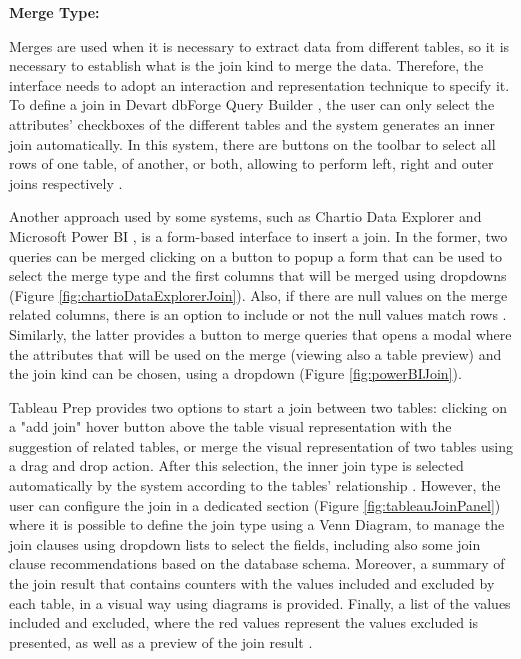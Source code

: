 \textbf{Merge Type:}



Merges are used when it is necessary to extract data from different tables, so it is necessary to establish what is the join kind to merge the data. Therefore, the interface needs to adopt an interaction and representation technique to specify it. To define a join in Devart dbForge Query Builder \cite{dbForgeQueryBuilder}, the user can only select the attributes’ checkboxes of the different tables and the system generates an inner join automatically. In this system, there are buttons on the toolbar to select all rows of one table, of another, or both, allowing to perform left, right and outer joins respectively \cite{dbForgeMakingJoinsBetweenTables}.
  
Another approach used by some systems, such as Chartio Data Explorer \cite{chartioDataExplorer} and Microsoft Power BI \cite{powerBI}, is a form-based interface to insert a join. In the former, two queries can be merged clicking on a button to popup a form that can be used to select the merge type and the first columns that will be merged using dropdowns \cite{chartioDataExplorer} (Figure \ref{fig:chartioDataExplorerJoin}). Also, if there are null values on the merge related columns, there is an option to include or not the null values match rows \cite{chartioJoiningDataAcrossDatabases}. Similarly, the latter provides a button to merge queries that opens a modal where the attributes that will be used on the merge (viewing also a table preview) and the join kind can be chosen, using a dropdown \cite{powerBIShapeAndCombineData} (Figure \ref{fig:powerBIJoin}).
  
Tableau Prep \cite{tableauPrep} provides two options to start a join between two tables: clicking on a "add join" hover button above the table visual representation with the suggestion of related tables, or merge the visual representation of two tables using a drag and drop action. After this selection, the inner join type is selected automatically by the system according to the tables' relationship \cite{tableauAggregateJoinOrUnionData,tableauAddMoreDataInTheInputStep}. However, the user can configure the join in a dedicated section (Figure \ref{fig:tableauJoinPanel}) where it is possible to define the join type using a Venn Diagram, to manage the join clauses using dropdown lists to select the fields, including also some join clause recommendations based on the database schema. Moreover, a summary of the join result that contains counters with the values included and excluded by each table, in a visual way using diagrams is provided. Finally, a list of the values included and excluded, where the red values represent the values excluded is presented, as well as a preview of the join result \cite{tableauAggregateJoinOrUnionData}.

